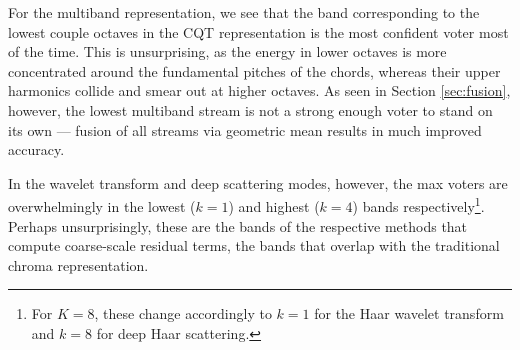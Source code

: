 For the multiband representation, we see that the band corresponding to the lowest couple octaves in the CQT representation is the most confident voter most of the time. This is unsurprising, as the energy in lower octaves is more concentrated around the fundamental pitches of the chords, whereas their upper harmonics collide and smear out at higher octaves. As seen in Section \ref{sec:fusion}, however, the lowest multiband stream is not a strong enough voter to stand on its own --- fusion of all streams via geometric mean results in much improved accuracy.

In the wavelet transform and deep scattering modes, however, the max voters are overwhelmingly in the lowest ($k=1$) and highest ($k=4$) bands respectively\footnote{For $K=8$, these change accordingly to $k=1$ for the Haar wavelet transform and $k=8$ for deep Haar scattering.}. Perhaps unsurprisingly, these are the bands of the respective methods that compute coarse-scale residual terms, \ie the bands that overlap with the traditional chroma representation. 